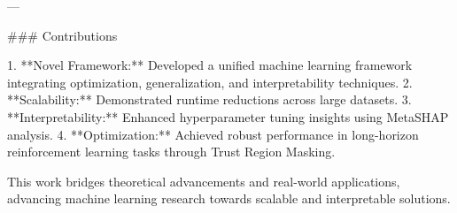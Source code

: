 ---

### Contributions  

1. **Novel Framework:** Developed a unified machine learning framework integrating optimization, generalization, and interpretability techniques.  
2. **Scalability:** Demonstrated runtime reductions across large datasets.  
3. **Interpretability:** Enhanced hyperparameter tuning insights using MetaSHAP analysis.  
4. **Optimization:** Achieved robust performance in long-horizon reinforcement learning tasks through Trust Region Masking.  

This work bridges theoretical advancements and real-world applications, advancing machine learning research towards scalable and interpretable solutions.